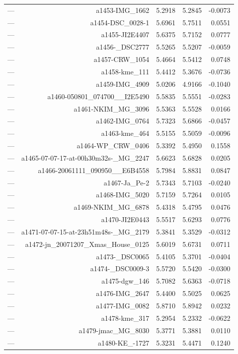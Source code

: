 \begin{table}[htbp]
\begin{tabular}{lrrrr}
— & a1453-IMG_1662 & 5.2918 & 5.2845 & -0.0073 \\
— & a1454-DSC_0028-1 & 5.6961 & 5.7511 & 0.0551 \\
— & a1455-JI2E4407 & 5.6375 & 5.7152 & 0.0777 \\
— & a1456-_DSC2777 & 5.5265 & 5.5207 & -0.0059 \\
— & a1457-CRW_1054 & 5.4664 & 5.5412 & 0.0748 \\
— & a1458-kme_111 & 5.4412 & 5.3676 & -0.0736 \\
— & a1459-IMG_4909 & 5.0206 & 4.9166 & -0.1040 \\
— & a1460-050801_074700__I2E5490 & 5.5835 & 5.5551 & -0.0283 \\
— & a1461-NKIM_MG_3096 & 5.5363 & 5.5528 & 0.0166 \\
— & a1462-IMG_0764 & 5.7323 & 5.6866 & -0.0457 \\
— & a1463-kme_464 & 5.5155 & 5.5059 & -0.0096 \\
— & a1464-WP_CRW_0406 & 5.3392 & 5.4950 & 0.1558 \\
— & a1465-07-07-17-at-00h30m32s-_MG_2247 & 5.6623 & 5.6828 & 0.0205 \\
— & a1466-20061111_090950__E6B4558 & 5.7984 & 5.8831 & 0.0847 \\
— & a1467-Ja_Pe-2 & 5.7343 & 5.7103 & -0.0240 \\
— & a1468-IMG_5020 & 5.7159 & 5.7264 & 0.0105 \\
— & a1469-NKIM_MG_6878 & 5.4318 & 5.4795 & 0.0476 \\
— & a1470-JI2E0443 & 5.5517 & 5.6293 & 0.0776 \\
— & a1471-07-07-15-at-23h51m48s-_MG_2179 & 5.3841 & 5.3529 & -0.0312 \\
— & a1472-jn_20071207_Xmas_House_0125 & 5.6019 & 5.6731 & 0.0711 \\
— & a1473-_DSC0065 & 5.4105 & 5.3701 & -0.0404 \\
— & a1474-_DSC0009-3 & 5.5720 & 5.5420 & -0.0300 \\
— & a1475-dgw_146 & 5.7082 & 5.6363 & -0.0718 \\
— & a1476-IMG_2647 & 5.4400 & 5.5025 & 0.0625 \\
— & a1477-IMG_0082 & 5.8710 & 5.8942 & 0.0232 \\
— & a1478-kme_317 & 5.2954 & 5.2332 & -0.0622 \\
— & a1479-jmac_MG_8030 & 5.3771 & 5.3881 & 0.0110 \\
— & a1480-KE_-1727 & 5.3231 & 5.4471 & 0.1240 \\

\end{tabular}
\end{table}
